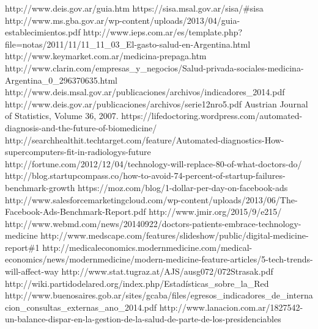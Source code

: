 \documentclass[a4paper,10pt]{article}
\begin{document}
\begin{thebibliography}{23}%
 http://www.deis.gov.ar/guia.htm 
 https://sisa.msal.gov.ar/sisa/\#sisa 
 http://www.ms.gba.gov.ar/wp-content/uploads/2013/04/guia-establecimientos.pdf
 http://www.ieps.com.ar/es/template.php?file=notas/2011/11/11\_11\_03\_El-gasto-salud-en-Argentina.html
 http://www.keymarket.com.ar/medicina-prepaga.htm
 http://www.clarin.com/empresas\_y\_negocios/Salud-privada-sociales-medicina-Argentina\_0\_296370635.html
 http://www.deis.msal.gov.ar/publicaciones/archivos/indicadores\_2014.pdf 
 http://www.deis.gov.ar/publicaciones/archivos/serie12nro5.pdf 
 Austrian Journal of Statistics, Volume 36, 2007.
 https://lifedoctoring.wordpress.com/automated-diagnosis-and-the-future-of-biomedicine/
 http://searchhealthit.techtarget.com/feature/Automated-diagnostics-How-supercomputers-fit-in-radiologys-future
 http://fortune.com/2012/12/04/technology-will-replace-80-of-what-doctors-do/
 http://blog.startupcompass.co/how-to-avoid-74-percent-of-startup-failures-benchmark-growth
 https://moz.com/blog/1-dollar-per-day-on-facebook-ads
 http://www.salesforcemarketingcloud.com/wp-content/uploads/2013/06/The-Facebook-Ads-Benchmark-Report.pdf
 http://www.jmir.org/2015/9/e215/ 
 http://www.webmd.com/news/20140922/doctors-patients-embrace-technology-medicine
 http://www.medscape.com/features/slideshow/public/digital-medicine-report\#1
 http://medicaleconomics.modernmedicine.com/medical-economics/news/modernmedicine/modern-medicine-feature-articles/5-tech-trends-will-affect-way
 http://www.stat.tugraz.at/AJS/ausg072/072Strasak.pdf
 http://wiki.partidodelared.org/index.php/Estadísticas\_sobre\_la\_Red
 http://www.buenosaires.gob.ar/sites/gcaba/files/egresos\_indicadores\_de\_internacion\_consultas\_externas\_ano\_2014.pdf
 http://www.lanacion.com.ar/1827542-un-balance-dispar-en-la-gestion-de-la-salud-de-parte-de-los-presidenciables
\end{thebibliography}
\end{document}
